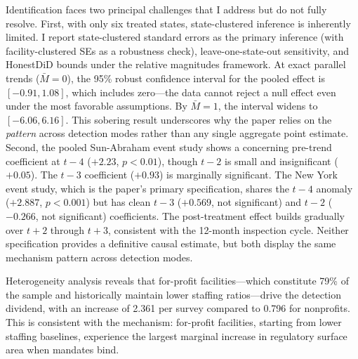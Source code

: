 \documentclass[12pt]{article}
\begin{document}
Identification faces two principal challenges that I address but do not fully resolve. First, with only six treated states, state-clustered inference is inherently limited. I report state-clustered standard errors as the primary inference (with facility-clustered SEs as a robustness check), leave-one-state-out sensitivity, and HonestDiD bounds under the \citet{rambachan2023} relative magnitudes framework. At exact parallel trends ($\bar{M} = 0$), the 95\% robust confidence interval for the pooled effect is $[-0.91, 1.08]$, which includes zero---the data cannot reject a null effect even under the most favorable assumptions. By $\bar{M} = 1$, the interval widens to $[-6.06, 6.16]$. This sobering result underscores why the paper relies on the \textit{pattern} across detection modes rather than any single aggregate point estimate. Second, the pooled Sun-Abraham event study shows a concerning pre-trend coefficient at $t-4$ ($+2.23$, $p < 0.01$), though $t-2$ is small and insignificant ($+0.05$). The $t-3$ coefficient ($+0.93$) is marginally significant. The New York event study, which is the paper's primary specification, shares the $t-4$ anomaly ($+2.887$, $p < 0.001$) but has clean $t-3$ ($+0.569$, not significant) and $t-2$ ($-0.266$, not significant) coefficients. The post-treatment effect builds gradually over $t+2$ through $t+3$, consistent with the 12-month inspection cycle. Neither specification provides a definitive causal estimate, but both display the same mechanism pattern across detection modes.

Heterogeneity analysis reveals that for-profit facilities---which constitute 79\% of the sample and historically maintain lower staffing ratios---drive the detection dividend, with an increase of 2.361 per survey compared to 0.796 for nonprofits. This is consistent with the mechanism: for-profit facilities, starting from lower staffing baselines, experience the largest marginal increase in regulatory surface area when mandates bind.
\end{document}
